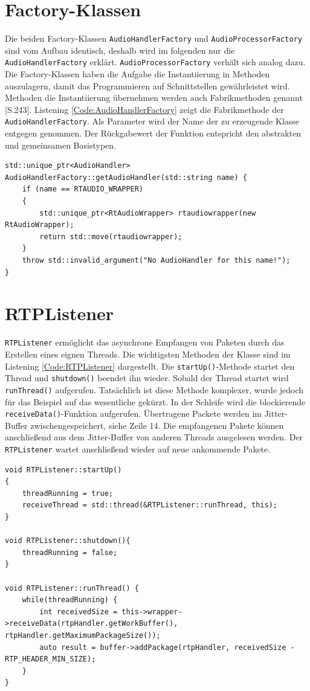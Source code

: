 \section{Factory-Klassen}
Die beiden Factory-Klassen \texttt{AudioHandlerFactory} und \texttt{AudioProcessorFactory} sind vom Aufbau identisch, deshalb wird im folgenden nur die \texttt{AudioHandlerFactory} erklärt. \texttt{AudioProcessorFactory} verhält sich analog dazu. Die Factory-Klassen haben die Aufgabe die Instantiierung in Methoden auszulagern, damit das Programmieren auf Schnittstellen gewährleistet wird. Methoden die Instantiierung übernehmen werden auch Fabrikmethoden genannt \cite{Goll2013}[S.243]. Listening \ref{Code:AudioHandlerFactory} zeigt die Fabrikmethode der \texttt{AudioHandlerFactory}. Als Parameter wird der Name der zu erzeugende Klasse entgegen genommen. Der Rückgabewert der Funktion entspricht den abstrakten und gemeinsamen Basistypen.

\begin{lstlisting}[caption={Fabrikmethode der AudioHandlerFactory},label={Code:AudioHandlerFactory}]
std::unique_ptr<AudioHandler> AudioHandlerFactory::getAudioHandler(std::string name) {
	if (name == RTAUDIO_WRAPPER)
	{
		std::unique_ptr<RtAudioWrapper> rtaudiowrapper(new RtAudioWrapper);
		return std::move(rtaudiowrapper);
	}
	throw std::invalid_argument("No AudioHandler for this name!");
}
\end{lstlisting}

\section{RTPListener}
\texttt{RTPListener} ermöglicht das asynchrone Empfangen von Paketen durch das Erstellen eines eignen Threads. Die wichtigsten Methoden der Klasse sind im Listening \ref{Code:RTPListener} dargestellt. Die \texttt{startUp()}-Methode startet den Thread und \texttt{shutdown()} beendet ihn wieder. Sobald der Thread startet wird \texttt{runThread()} aufgerufen. Tatsächlich ist diese Methode komplexer, wurde jedoch für das Beispiel auf das wesentliche gekürzt. In der Schleife wird die blockierende \texttt{receiveData()}-Funktion aufgerufen. Übertragene Packete werden im Jitter-Buffer zwischengespeichert, siehe Zeile 14. Die empfangenen Pakete können anschließend aus dem Jitter-Buffer von anderen Threads ausgelesen werden. Der \texttt{RTPListener} wartet anschließend wieder auf neue ankommende Pakete.

\begin{lstlisting}[caption={Die wichtigsten Methoden des RTPListeners},label={Code:RTPListener}]
void RTPListener::startUp()
{
    threadRunning = true;
    receiveThread = std::thread(&RTPListener::runThread, this);
}

void RTPListener::shutdown(){
	threadRunning = false;
}

void RTPListener::runThread() {
	while(threadRunning) {
		int receivedSize = this->wrapper->receiveData(rtpHandler.getWorkBuffer(), rtpHandler.getMaximumPackageSize());
		auto result = buffer->addPackage(rtpHandler, receivedSize - RTP_HEADER_MIN_SIZE);
	}
}
\end{lstlisting}

